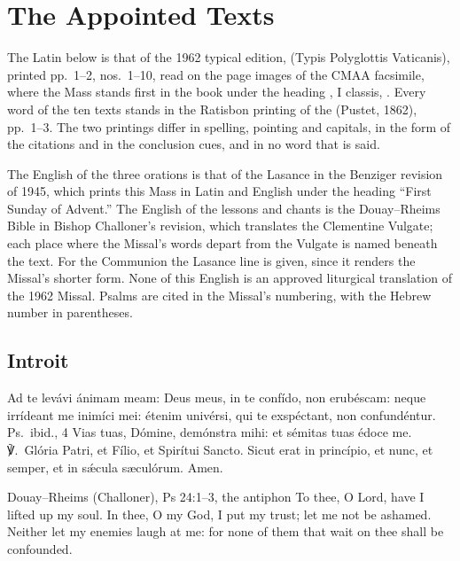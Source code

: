 \section{The Appointed Texts}
\label{sec:appointed-texts}

The Latin below is that of the 1962 typical edition, 
(Typis Polyglottis Vaticanis), printed pp.~1--2, nos.~1--10, read on the page
images of the CMAA facsimile, where the Mass stands first in the book under
the heading , I classis, . Every word of the ten texts stands in the Ratisbon printing
of the  (Pustet, 1862), pp.~1--3. The two printings
differ in spelling, pointing and capitals, in the form of the citations and in
the conclusion cues, and in no word that is said.

The English of the three orations is that of the Lasance  in the Benziger revision of 1945, which prints this Mass in Latin and
English under the heading ``First Sunday of Advent.'' The English of the
lessons and chants is the Douay--Rheims Bible in Bishop Challoner's revision,
which translates the Clementine Vulgate; each place where the Missal's words
depart from the Vulgate is named beneath the text. For the Communion the
Lasance line is given, since it renders the Missal's shorter form. None of
this English is an approved liturgical translation of the 1962 Missal. Psalms
are cited in the Missal's numbering, with the Hebrew number in parentheses.

\subsection{Introit}
\label{proper-introit}


\begin{latinproper}
Ad te levávi ánimam meam: Deus meus, in te confído, non erubéscam: neque
irrídeant me inimíci mei: étenim univérsi, qui te exspéctant, non
confundéntur. \textnormal{Ps.\ ibid., 4} Vias tuas, Dómine, demónstra mihi:
et sémitas tuas édoce me. ℣.~Glória Patri, et Fílio, et Spirítui Sancto. Sicut
erat in princípio, et nunc, et semper, et in sǽcula sæculórum. Amen.
\end{latinproper}

\begin{englishwitness}{Douay--Rheims (Challoner), Ps 24:1--3, the antiphon}
To thee, O Lord, have I lifted up my soul. In thee, O my God, I put my trust;
let me not be ashamed. Neither let my enemies laugh at me: for none of them
that wait on thee shall be confounded.
\end{englishwitness}

